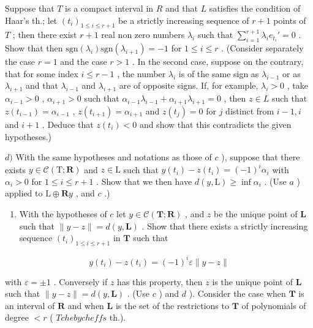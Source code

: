 \begin{enumerate}
  Suppose that \(T\) is a compact interval in \(R\) and that \(L\) satisfies the condition of Haar's th.; let \((t_i)_{1 \leqslant i \leqslant r+1}\) be a strictly increasing sequence of \(r + 1\) points of \(T\) ; then there exist \(r + 1\) real non zero numbers \(\lambda_i\) such that \(\sum_{i=1}^{r+1} \lambda_i e_{t_i}' = 0\) . Show that then \(\text{sgn}(\lambda_i) \text{sgn}(\lambda_{i+1}) = -1\) for \(1 \leqslant i \leqslant r\) . (Consider separately the case \(r = 1\) and the case \(r > 1\) . In the second case, suppose on the contrary, that for some index \(i \leqslant r - 1\) , the number \(\lambda_i\) is of the same sign as \(\lambda_{i-1}\) or as \(\lambda_{i+1}\) and that \(\lambda_{i-1}\) and \(\lambda_{i+1}\) are of opposite signs. If, for example, \(\lambda_i > 0\) , take \(\alpha_{i-1} > 0\) , \(\alpha_{i+1} > 0\) such that \(\alpha_{i-1} \lambda_{i-1} + \alpha_{i+1} \lambda_{i+1} = 0\) , then \(z \in L\) such that \(z(t_{i-1}) = \alpha_{i-1}\) , \(z(t_{i+1}) = \alpha_{i+1}\) and \(z(t_j) = 0\) for \(j\) distinct from \(i - 1, i\) and \(i + 1\) . Deduce that \(z(t_i) < 0\) and show that this contradicts the given hypotheses.)
\end{enumerate}

\(d)\) With the same hypotheses and notations as those of \(c\) ), suppose that there exists \(y \in \mathcal{C}(\mathrm{T}; \mathbf{R})\) and \(z \in \mathrm{L}\) such that \(y(t_i) - z(t_i) = (-1)^i \alpha_i\) with \(\alpha_i > 0\) for \(1 \leqslant i \leqslant r + 1\) . Show that we then have \(d(y, \mathrm{L}) \geqslant \inf \alpha_i\) . (Use \(a\) ) applied to \(\mathrm{L} \oplus \mathbf{R}y\) , and \(c\) .)

\begin{enumerate}
\def\labelenumi{\alph{enumi})}
\setcounter{enumi}{4}
\tightlist
\item
  With the hypotheses of \(c\) let \(y \in \mathcal{C}(\mathbf{T};\mathbf{R})\) , and \(z\) be the unique point of \(\mathbf{L}\) such that \(\| y - z \| = d(y,\mathbf{L})\) . Show that there exists a strictly increasing sequence \((t_i)_{1\leqslant i\leqslant r + 1}\) in \(\mathbf{T}\) such that
\end{enumerate}

\[
y (t _ {i}) - z (t _ {i}) = (- 1) ^ {i} \varepsilon \| y - z \|
\]

with \(\varepsilon = \pm 1\) . Conversely if \(z\) has this property, then \(z\) is the unique point of \(\mathbf{L}\) such that \(\| y - z \| = d(y, \mathbf{L})\) . (Use \(c\) ) and \(d\) ). Consider the case when \(\mathbf{T}\) is an interval of \(\mathbf{R}\) and when \(\mathbf{L}\) is the set of the restrictions to \(\mathbf{T}\) of polynomials of degree \(< r\) ( \(Tchebycheffs\) th.).

